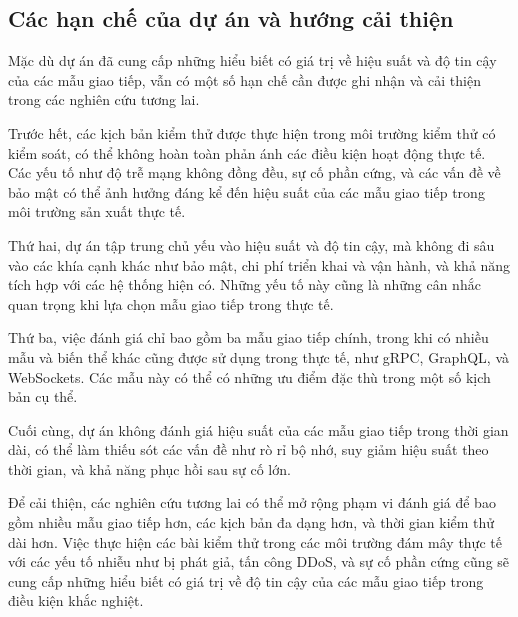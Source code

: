 \subsection{Các hạn chế của dự án và hướng cải thiện}
Mặc dù dự án đã cung cấp những hiểu biết có giá trị về hiệu suất và độ tin cậy của các mẫu giao tiếp, vẫn có một số hạn chế cần được ghi nhận và cải thiện trong các nghiên cứu tương lai.

Trước hết, các kịch bản kiểm thử được thực hiện trong môi trường kiểm thử có kiểm soát, có thể không hoàn toàn phản ánh các điều kiện hoạt động thực tế. Các yếu tố như độ trễ mạng không đồng đều, sự cố phần cứng, và các vấn đề về bảo mật có thể ảnh hưởng đáng kể đến hiệu suất của các mẫu giao tiếp trong môi trường sản xuất thực tế.

Thứ hai, dự án tập trung chủ yếu vào hiệu suất và độ tin cậy, mà không đi sâu vào các khía cạnh khác như bảo mật, chi phí triển khai và vận hành, và khả năng tích hợp với các hệ thống hiện có. Những yếu tố này cũng là những cân nhắc quan trọng khi lựa chọn mẫu giao tiếp trong thực tế.

Thứ ba, việc đánh giá chỉ bao gồm ba mẫu giao tiếp chính, trong khi có nhiều mẫu và biến thể khác cũng được sử dụng trong thực tế, như gRPC, GraphQL, và WebSockets. Các mẫu này có thể có những ưu điểm đặc thù trong một số kịch bản cụ thể.

Cuối cùng, dự án không đánh giá hiệu suất của các mẫu giao tiếp trong thời gian dài, có thể làm thiếu sót các vấn đề như rò rỉ bộ nhớ, suy giảm hiệu suất theo thời gian, và khả năng phục hồi sau sự cố lớn.

Để cải thiện, các nghiên cứu tương lai có thể mở rộng phạm vi đánh giá để bao gồm nhiều mẫu giao tiếp hơn, các kịch bản đa dạng hơn, và thời gian kiểm thử dài hơn. Việc thực hiện các bài kiểm thử trong các môi trường đám mây thực tế với các yếu tố nhiễu như bị phát giả, tấn công DDoS, và sự cố phần cứng cũng sẽ cung cấp những hiểu biết có giá trị về độ tin cậy của các mẫu giao tiếp trong điều kiện khắc nghiệt.